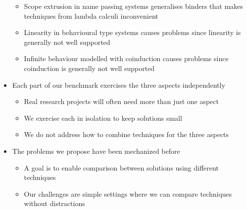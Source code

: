\documentclass{article}
\begin{document}
\begin{itemize}
  \begin{itemize}
  \item Scope extrusion in name passing systems generalises binders that makes techniques from lambda calculi inconvenient
  \item Linearity in behavioural type systems causes problems since linearity is generally not well supported
  \item Infinite behaviour modelled with coinduction causes problems since coinduction is generally not well supported
  \end{itemize}
\item Each part of our benchmark exercises the three aspects independently
  \begin{itemize}
  \item Real research projects will often need more than just one aspect
  \item We exercise each in isolation to keep solutions small
  \item We do not address how to combine techniques for the three aspects
  \end{itemize}
\item The problems we propose have been mechanized before
  \begin{itemize}
  \item A goal is to enable comparison between solutions using different techniques
  \item Our challenges are simple settings where we can compare techniques without distractions
  \end{itemize}
\end{itemize}
\end{document}
